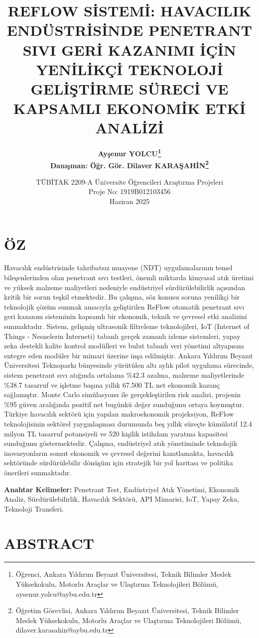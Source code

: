 \documentclass[12pt,a4paper]{article}
\title{\fontsize{15}{18}\selectfont\bfseries\MakeUppercase{REFLOw SİSTEMİ: HAVACILIK ENDÜSTRİSİNDE PENETRANT SIVI GERİ KAZANIMI İÇİN YENİLİKÇİ TEKNOLOJİ GELİŞTİRME SÜRECİ VE KAPSAMLI EKONOMİK ETKİ ANALİZİ}}
\author{\fontsize{13}{15}\selectfont\bfseries Ayşenur YOLCU\footnote{Öğrenci, Ankara Yıldırım Beyazıt Üniversitesi, Teknik Bilimler Meslek Yüksekokulu, Motorlu Araçlar ve Ulaştırma Teknolojileri Bölümü, aysenur.yolcu@aybu.edu.tr}\\[0.5cm]
\fontsize{13}{15}\selectfont Danışman: Öğr. Gör. Dilaver KARAŞAHİN\footnote{Öğretim Görevlisi, Ankara Yıldırım Beyazıt Üniversitesi, Teknik Bilimler Meslek Yüksekokulu, Motorlu Araçlar ve Ulaştırma Teknolojileri Bölümü, dilaver.karasahin@aybu.edu.tr}}
\date{TÜBİTAK 2209-A Üniversite Öğrencileri Araştırma Projeleri\\
Proje No: 1919B012103456\\
Haziran 2025}
\begin{document}
\maketitle

\section*{\bfseries ÖZ}

Havacılık endüstrisinde tahribatsız muayene (NDT) uygulamalarının temel bileşenlerinden olan penetrant sıvı testleri, önemli miktarda kimyasal atık üretimi ve yüksek malzeme maliyetleri nedeniyle endüstriyel sürdürülebilirlik açısından kritik bir sorun teşkil etmektedir. Bu çalışma, söz konusu soruna yenilikçi bir teknolojik çözüm sunmak amacıyla geliştirilen ReFlow otomatik penetrant sıvı geri kazanım sisteminin kapsamlı bir ekonomik, teknik ve çevresel etki analizini sunmaktadır. Sistem, gelişmiş ultrasonik filtreleme teknolojileri, IoT (Internet of Things - Nesnelerin İnterneti) tabanlı gerçek zamanlı izleme sistemleri, yapay zeka destekli kalite kontrol modülleri ve bulut tabanlı veri yönetimi altyapısını entegre eden modüler bir mimari üzerine inşa edilmiştir. Ankara Yıldırım Beyazıt Üniversitesi Teknoparkı bünyesinde yürütülen altı aylık pilot uygulama sürecinde, sistem penetrant sıvı atığında ortalama \%42.3 azalma, malzeme maliyetlerinde \%38.7 tasarruf ve işletme başına yıllık 67.500 TL net ekonomik kazanç sağlamıştır. Monte Carlo simülasyonu ile gerçekleştirilen risk analizi, projenin \%95 güven aralığında pozitif net bugünkü değer sunduğunu ortaya koymuştur. Türkiye havacılık sektörü için yapılan makroekonomik projeksiyon, ReFlow teknolojisinin sektörel yaygınlaşması durumunda beş yıllık süreçte kümülatif 12.4 milyon TL tasarruf potansiyeli ve 520 kişilik istihdam yaratma kapasitesi sunduğunu göstermektedir. Çalışma, endüstriyel atık yönetiminde teknolojik inovasyonların somut ekonomik ve çevresel değerini kanıtlamakta, havacılık sektöründe sürdürülebilir dönüşüm için stratejik bir yol haritası ve politika önerileri sunmaktadır.

\textbf{Anahtar Kelimeler:} Penetrant Test, Endüstriyel Atık Yönetimi, Ekonomik Analiz, Sürdürülebilirlik, Havacılık Sektörü, API Mimarisi, IoT, Yapay Zeka, Teknoloji Transferi.

\section*{\bfseries ABSTRACT}
\end{document}

